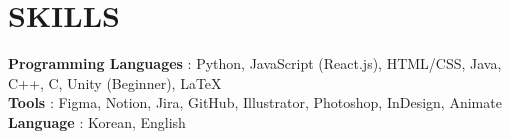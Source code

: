 \documentclass[letterpaper,11pt]{article}
\begin{document}
%
\section{SKILLS}
 \begin{itemize}[leftmargin=0in, label={}]
    \small{\item{
     \textbf{Programming Languages} {: Python, JavaScript (React.js), HTML/CSS, Java, C++, C, Unity (Beginner), LaTeX}\vspace{2pt} \\
     \textbf{Tools}     {: Figma, Notion, Jira, GitHub, Illustrator, Photoshop, InDesign, Animate}\vspace{2pt} \\
     \textbf{Language}     {: Korean, English}
    }}
 \end{itemize}


\end{document}
